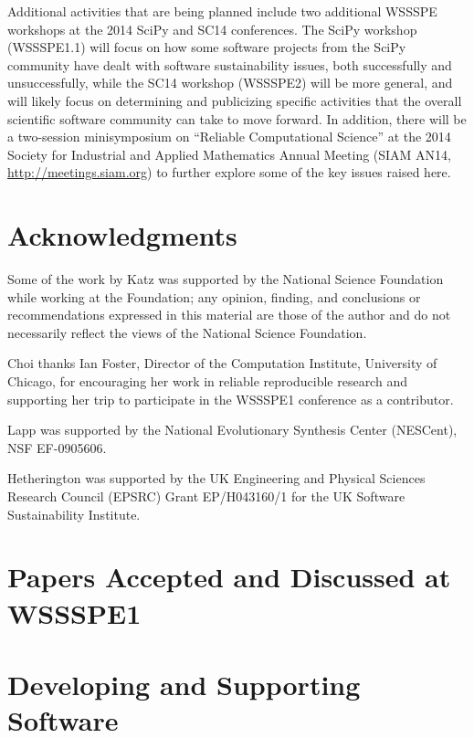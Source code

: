 \documentclass[11pt, oneside]{amsart}
\newcommand{\todo}[1]{{\color{blue}$\blacksquare$~\textsf{[TODO: #1]}}}
\begin{document}
Additional activities that are being planned include two additional
WSSSPE workshops at the 2014 SciPy and SC14 conferences.  The SciPy
workshop (WSSSPE1.1) will focus on how some software projects from the
SciPy community have dealt with software sustainability issues, both
successfully and unsuccessfully, while the SC14 workshop (WSSSPE2)
will be more general, and will likely focus on determining and
publicizing specific activities that the overall scientific software
community can take to move forward.  In addition, there will be a
two-session minisymposium on ``Reliable Computational Science'' at the 2014
Society for Industrial and Applied Mathematics Annual Meeting (SIAM
AN14, \url{http://meetings.siam.org}) to further explore some of the
key issues raised here.




\section*{Acknowledgments}


Some of the work by Katz was supported by the National Science
Foundation while working at the Foundation; any opinion, finding, and
conclusions or recommendations expressed in this material are those of
the author and do not necessarily reflect the views of the National
Science Foundation.

Choi thanks Ian Foster, Director of the Computation Institute,
University of Chicago, for encouraging her work in reliable
reproducible research and supporting her trip to participate in the
WSSSPE1 conference as a contributor.

Lapp was supported by the National Evolutionary Synthesis Center
(NESCent), NSF EF-0905606.

Hetherington was supported by the UK Engineering and Physical Sciences
Research Council (EPSRC) Grant EP/H043160/1 for the UK Software
Sustainability Institute.



\appendix
\section{Papers Accepted and Discussed at WSSSPE1} \label{sec:papers}

\section*{Developing and Supporting Software}
\end{document}
